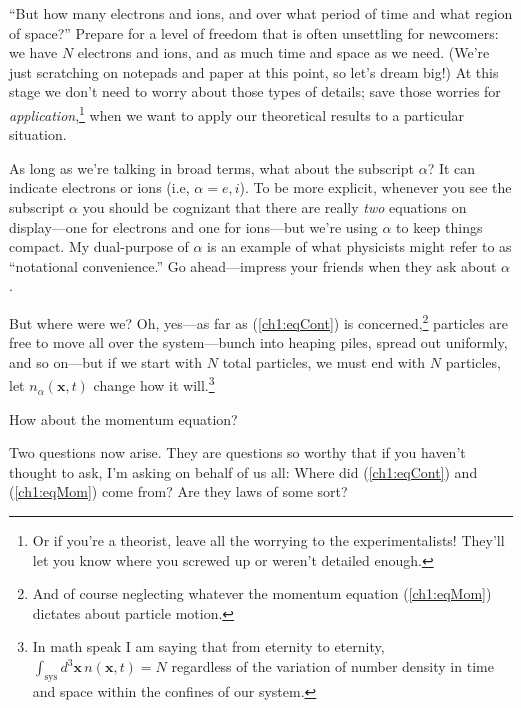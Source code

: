 ``But how many electrons and ions, and over what period of time and what region
of space?'' Prepare for a level of freedom that is often unsettling for
newcomers: we have $N$ electrons and ions, and as much time and space as we
need. (We're just scratching on notepads and paper at this point, so let's dream
big!) At this stage we don't need to worry about those types of details; save
those worries for \emph{application},\footnote{Or if you're a theorist, leave
  all the worrying to the experimentalists! They'll let you know where you
  screwed up or weren't detailed enough.} when we want to apply our theoretical
results to a particular situation.

As long as we're talking in broad terms, what about the subscript $\alpha$?
It can indicate electrons or ions (i.e, $\alpha = e,i$). To be more
explicit, whenever you see the subscript $\alpha$ you should be cognizant
that there are really \emph{two} equations on display---one for electrons and
one for ions---but we're using $\alpha$ to keep things compact. My
dual-purpose of $\alpha$ is an example of what physicists might refer to as
``notational convenience.'' Go ahead---impress your friends when they ask about
$\alpha$.

But where were we? Oh, yes---as far as (\ref{ch1:eqCont}) is
concerned,\footnote{And of course neglecting whatever the momentum equation
  (\ref{ch1:eqMom}) dictates about particle motion.}  particles are free to move
all over the system---bunch into heaping piles, spread out uniformly, and so
on---but if we start with $N$ total particles, we must end with $N$ particles,
let $n_{\alpha}(\mathbf{x},t)$ change how it will.\footnote{In math speak I
  am saying that from eternity to eternity,
  $\int_{\mathrm{sys}} d^3\mathbf{x} \, n(\mathbf{x},t) = N$ regardless of the
  variation of number density in time and space within the confines of our
  system.}

How about the momentum equation? 

Two questions now arise. They are questions so worthy that if you haven't
thought to ask, I'm asking on behalf of us all: Where did (\ref{ch1:eqCont}) and
(\ref{ch1:eqMom}) come from? Are they laws of some sort? 

